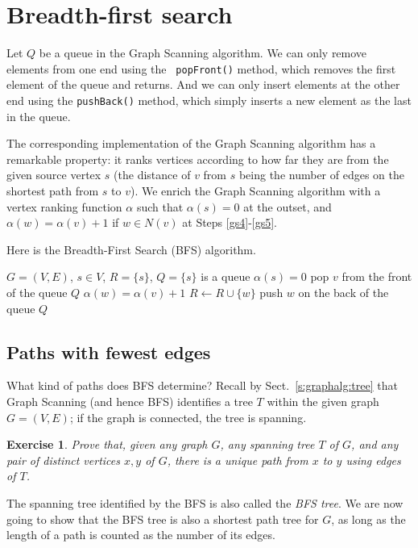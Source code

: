 \documentclass[a4paper]{book}
\theoremstyle{changebreak}                %
\newtheorem{ex}[result]{Exercise}
\begin{document}
\section{Breadth-first search}
\label{s:graphalg:bfs}
Let $Q$ be a queue in the {\sc Graph Scanning}
algorithm. We can only remove elements from one end using the {\tt
  popFront()} method, which removes the first
element of the queue and returns. And we can only insert elements at
the other end using the {\tt pushBack()}
method, which simply inserts a new element as the last in the queue.

The corresponding implementation of the {\sc Graph Scanning} algorithm
has a remarkable property: it ranks vertices according to how far they
are from the given source vertex $s$ (the distance of $v$ from $s$
being the number of edges on the shortest path from $s$ to $v$).  We
enrich the {\sc Graph Scanning} algorithm with a vertex ranking
function $\alpha$ such that $\alpha(s)=0$ at the outset, and
$\alpha(w)=\alpha(v)+1$ if $w\in N(v)$ at Steps \ref{gs4}-\ref{gs5}.

Here is the {\sc Breadth-First Search} (BFS) algorithm.
\begin{algorithmic}[1]
\REQUIRE $G=(V,E)$, $s\in V$, $R=\{s\}$, $Q=\{s\}$ is a
queue
\STATE $\alpha(s)=0$ \label{bfs1}
 \label{bfs2}
  \STATE pop $v$ from the front of the queue $Q$ \label{bfs3} 
   \label{bfs5}
    \STATE $\alpha(w)=\alpha(v)+1$ \label{bfs6}
    \STATE $R\leftarrow R\cup\{w\}$ \label{bfs7}
    \STATE push $w$ on the back of the queue $Q$ \label{bfs8}
  \ENDFOR
\ENDWHILE
\end{algorithmic}

\subsection{Paths with fewest edges}
What kind of paths does BFS determine? Recall
by Sect.~\ref{s:graphalg:tree} that {\sc Graph Scanning} (and hence
BFS) identifies a tree $T$ within the given
graph $G=(V,E)$; if the graph is
connected, the tree is
spanning.
\begin{ex}
Prove that, given any graph $G$, any spanning tree $T$ of $G$, and any
pair of distinct vertices $x,y$ of $G$, there
is a unique path from $x$ to $y$ using edges of
$T$.
\end{ex}
The spanning tree identified by the BFS is also called the {\it BFS
  tree}. We are now going to show that the BFS tree is
also a shortest path tree for $G$, as long
as the length of a path is counted as the number of
its edges.
\end{document}
